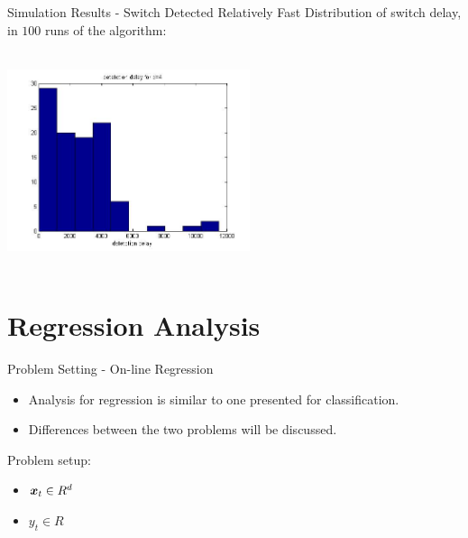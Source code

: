\documentclass{beamer}
\begin{document}
\begin{frame}{Simulation Results - Switch Detected Relatively Fast}
Distribution of switch delay, in $100$ runs of the algorithm:
\begin{center}
\includegraphics[height=2.5in,width=2.8in]{delay_clas.jpg}
\end{center}
\end{frame}

\section{Regression Analysis}
\begin{frame}{Problem Setting - On-line Regression}
\begin{itemize}
\item Analysis for regression is similar to one presented for classification.\newline
\item  Differences between the two problems will be discussed.\newline
\end{itemize}

Problem setup:

\begin{itemize}
\item ${\boldsymbol{x}}_{t}\in R^d$
\item $y_t\in R$
\end{itemize}

\end{frame}
\end{document}
